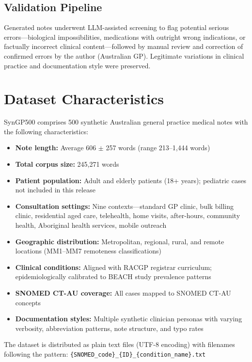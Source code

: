 \documentclass[11pt]{article}
\begin{document}
\subsection{Validation Pipeline}

Generated notes underwent LLM-assisted screening to flag potential serious errors—biological impossibilities, medications with outright wrong indications, or factually incorrect clinical content—followed by manual review and correction of confirmed errors by the author (Australian GP). Legitimate variations in clinical practice and documentation style were preserved.

\section{Dataset Characteristics}

SynGP500 comprises 500 synthetic Australian general practice medical notes with the following characteristics:

\begin{itemize}[noitemsep]
    \item \textbf{Note length:} Average 606 $\pm$ 257 words (range 213--1,444 words)
    \item \textbf{Total corpus size:} 245,271 words
    \item \textbf{Patient population:} Adult and elderly patients (18+ years); pediatric cases not included in this release
    \item \textbf{Consultation settings:} Nine contexts—standard GP clinic, bulk billing clinic, residential aged care, telehealth, home visits, after-hours, community health, Aboriginal health services, mobile outreach
    \item \textbf{Geographic distribution:} Metropolitan, regional, rural, and remote locations (MM1--MM7 remoteness classifications)
    \item \textbf{Clinical conditions:} Aligned with RACGP registrar curriculum; epidemiologically calibrated to BEACH study prevalence patterns
    \item \textbf{SNOMED CT-AU coverage:} All cases mapped to SNOMED CT-AU concepts
    \item \textbf{Documentation styles:} Multiple synthetic clinician personas with varying verbosity, abbreviation patterns, note structure, and typo rates
\end{itemize}

The dataset is distributed as plain text files (UTF-8 encoding) with filenames following the pattern: \texttt{\{SNOMED\_code\}\_\{ID\}\_\{condition\_name\}.txt}
\end{document}
